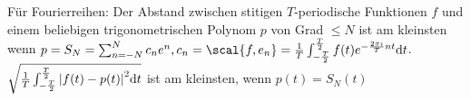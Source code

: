Für Fourierreihen: Der Abstand zwischen stitigen $T$-periodische Funktionen $f$ und einem beliebigen trigonometrischen Polynom $p$ von  Grad $\leq N$ ist am kleinsten wenn $p = S_N = \sum_{n = -N}^N c_n e^n , c_n = \scal{f,e_n} = \frac{1}{T} \int_{-\frac{T}{2}}^{\frac{T}{2}} f(t) e^{-\frac{2\pi\imath}{T} nt} \dd t$. $\sqrt{\frac{1}{T} \int_{-\frac{T}{2}}^{\frac{T}{2}} \abs{f(t) - p(t)}^2 \dd t}$ ist am kleinsten, wenn $p(t) = S_N(t)$

